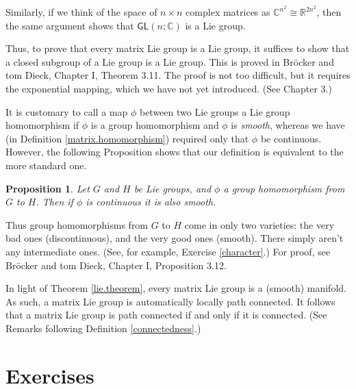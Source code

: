 \documentclass{amsbook}
\theoremstyle{plain}
\newtheorem{proposition}[theorem]{Proposition}
\numberwithin{equation}{chapter}
\numberwithin{theorem}{chapter}
\begin{document}
Similarly, if we think of the space of $n\times n$ complex matrices as
$\mathbb{C}^{n^{2}}\cong\mathbb{R}^{2n^{2}}$, then the same argument shows
that $\mathsf{GL}(n;\mathbb{C})$ is a Lie group.

Thus, to prove that every matrix Lie group is a Lie group, it suffices to show
that a closed subgroup of a Lie group is a Lie group. This is proved in
Br\"ocker and tom Dieck, Chapter I, Theorem 3.11. The proof is not too
difficult, but it requires the exponential mapping, which we have not yet
introduced. (See Chapter 3.)

It is customary to call a map $\phi$ between two Lie groups a Lie group
homomorphism if $\phi$ is a group homomorphism and $\phi$ is \textit{smooth},
whereas we have (in Definition \ref{matrix.homomorphism}) required only that
$\phi$ be continuous. However, the following Proposition shows that our
definition is equivalent to the more standard one.

\begin{proposition}
\label{homo.smooth}Let $G$ and $H$ be Lie groups, and $\phi$ a group
homomorphism from $G$ to $H$. Then if $\phi$ is continuous it is also smooth.
\end{proposition}

Thus group homomorphisms from $G$ to $H$ come in only two varieties: the very
bad ones (discontinuous), and the very good ones (smooth). There simply aren't
any intermediate ones. (See, for example, Exercise \ref{character}.) For
proof, see Br\"ocker and tom Dieck, Chapter I, Proposition 3.12.

In light of Theorem \ref{lie.theorem}, every matrix Lie group is a (smooth)
manifold. As such, a matrix Lie group is automatically locally path connected.
It follows that a matrix Lie group is path connected if and only if it is
connected. (See Remarks following Definition \ref{connectedness}.)

\section{Exercises}
\end{document}
